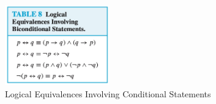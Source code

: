\documentclass[12pt]{article}
\begin{document}
\begin{figure}[H]
    \centering
    \includegraphics[width=0.4\textwidth]{"./Logical Equivalences Involving Biconditional Statements.jpg"}
    \caption{Logical Equivalences Involving Conditional Statements}
\end{figure}
\end{document}

